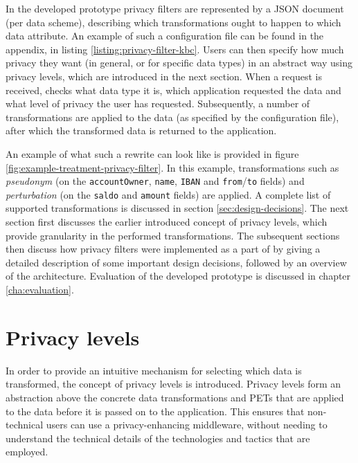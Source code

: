 

\newpage
\noindent In the developed prototype privacy filters are represented by a JSON document (per data scheme), describing which transformations ought to happen to which data attribute. An example of such a configuration file can be found in the appendix, in listing \ref{listing:privacy-filter-kbc}. Users can then specify how much privacy they want (in general, or for specific data types) in an abstract way using privacy levels, which are introduced in the next section. When a request is received, \middleware{} checks what data type it is, which application requested the data and what level of privacy the user has requested. Subsequently, a number of transformations are applied to the data (as specified by the configuration file), after which the transformed data is returned to the application. 

An example of what such a rewrite can look like is provided in figure \ref{fig:example-treatment-privacy-filter}. In this example, transformations such as \textit{pseudonym} (on the \texttt{accountOwner}, \texttt{name}, \texttt{IBAN} and \texttt{from}/\texttt{to} fields) and \textit{perturbation} (on the \texttt{saldo} and \texttt{amount} fields) are applied. A complete list of supported transformations is discussed in section \ref{sec:design-decisions}. The next section first discusses the earlier introduced concept of privacy levels, which provide granularity in the performed transformations. The subsequent sections then discuss how privacy filters were implemented as a part of \middleware{} by giving a detailed description of some important design decisions, followed by an overview of the architecture. Evaluation of the developed prototype is discussed in chapter \ref{cha:evaluation}.



\section{Privacy levels}
\label{sec:privacylevels}
\noindent In order to provide an intuitive mechanism for selecting which data is transformed, the concept of privacy levels is introduced. Privacy levels form an abstraction above the concrete data transformations and \gls{PETs} that are applied to the data before it is passed on to the application. This ensures that non-technical users can use a privacy-enhancing middleware, without needing to understand the technical details of the technologies and tactics that are employed. 

